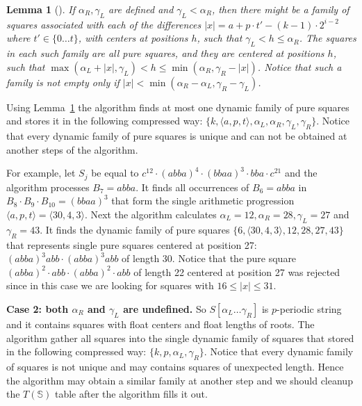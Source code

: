\documentclass[11pt]{article}
\theoremstyle{break}
\newtheorem{lem}[thm]{Lemma}
\newcommand{\prog}[3]{\langle #1, #2, #3\rangle}
\newcommand{\slp}[1]{\mathbb{#1}}
\newcommand{\substr}[2]{[#1\dots#2]}
\begin{document}
\begin{lem}[{\rm\cite{2}}]
If $\alpha_R, \gamma_L$ are defined and $\gamma_L < \alpha_R$, then there might be a family of squares
associated with each of the differences $|x| = a + p\cdot t' - (k-1)\cdot 2^{i-2}$ where $t' \in \{0\dots t\}$,
with centers at positions $h$, such that $\gamma_L < h \leq \alpha_R$. The squares in each such family are all
pure squares, and they are centered at positions $h$, such that $\max(\alpha_L + |x|, \gamma_L) < h \leq
\min(\alpha_R, \gamma_R-|x|)$. Notice that such a family is not empty only if $|x| < \min(\alpha_R-\alpha_L,
\gamma_R-\gamma_L)$.
\label{lem:dynamic_pure_squares}
\end{lem}

Using Lemma~\ref{lem:dynamic_pure_squares} the algorithm finds at most one dynamic family of pure squares and stores
it in the following compressed way: $\{k, \prog{a}{p}{t}, \alpha_L, \alpha_R, \gamma_L, \gamma_R\}$. Notice that every 
dynamic family of pure squares is unique and can not be obtained at another steps of the algorithm.

For example, let $S_j$ be equal to $c^{12} \cdot (abba)^4 \cdot (bbaa)^3 \cdot bba \cdot c^{21}$ and the algorithm processes $B_7 = abba$.
It finds all occurrences of $B_6 = abba$ in $B_8 \cdot B_9 \cdot B_{10} = (bbaa)^3$ that form the single arithmetic progression $\prog{a}{p}{t} = \prog{30}{4}{3}$. 
Next the algorithm calculates $\alpha_L = 12, \alpha_R = 28, \gamma_L = 27$ and $\gamma_R = 43$. It finds the dynamic family of pure squares 
$\{6, \prog{30}{4}{3}, 12, 28, 27, 43\}$ that represents single pure squares centered at position 27: $(abba)^3 abb \cdot (abba)^3 abb$ of length 30.
Notice that the pure square $(abba)^2 \cdot abb \cdot (abba)^2 \cdot abb$ of length 22 centered at position 27 was rejected since in this case 
we are looking for squares with $16 \leq |x| \leq 31$. 

\noindent \textbf{Case 2: both {\boldmath $\alpha_R$} and {\boldmath $\gamma_L$} are undefined.} So
$S\substr{\alpha_L}{\gamma_R}$ is $p$-periodic string and it contains squares with float centers and float lengths of
roots. The algorithm gather all squares into the single dynamic family of squares that stored in the following compressed way: $\{k, p, \alpha_L, \gamma_R\}$.
Notice that every dynamic family of squares is not unique and may contains squares of unexpected length. Hence the algorithm may obtain a similar family
at another step and we should cleanup the $T(\slp{S})$ table after the algorithm fills it out.
\end{document}
